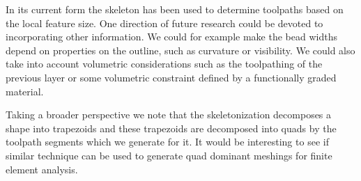 In its current form the skeleton has been used to determine toolpaths based on the local feature size.
One direction of future research could be devoted to incorporating other information.
We could for example make the bead widths depend on properties on the outline, such as curvature or visibility.
We could also take into account volumetric considerations such as the toolpathing of the previous layer or some volumetric constraint defined by a functionally graded material.

Taking a broader perspective we note that the skeletonization decomposes a shape into trapezoids and these trapezoids are decomposed into quads by the toolpath segments which we generate for it.
It would be interesting to see if similar technique can be used to generate quad dominant meshings for finite element analysis.
